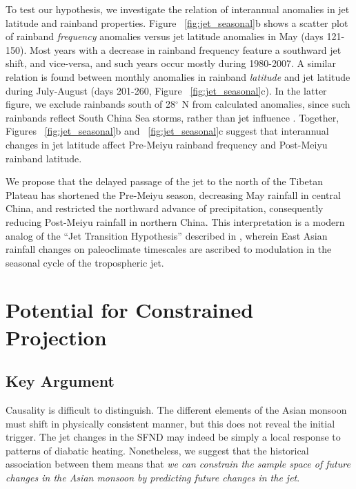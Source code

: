 	To test our hypothesis, we investigate the relation of interannual anomalies in jet latitude and rainband properties. Figure ~\ref{fig:jet_seasonal}b shows a scatter plot of rainband \textit{frequency} anomalies versus jet latitude anomalies in May (days 121-150). Most years with a decrease in rainband frequency feature a southward jet shift, and vice-versa, and such years occur mostly during 1980-2007. A similar relation is found between monthly anomalies in rainband \textit{latitude} and jet latitude during July-August (days 201-260, Figure ~\ref{fig:jet_seasonal}c). In the latter figure, we exclude rainbands south of 28$^{\circ}$ N from calculated anomalies, since such rainbands reflect South China Sea storms, rather than jet influence \citep{Day2015}. Together, Figures ~\ref{fig:jet_seasonal}b and ~\ref{fig:jet_seasonal}c suggest that interannual changes in jet latitude affect Pre-Meiyu rainband frequency and Post-Meiyu rainband latitude.
	
	 	 
	We propose that the delayed passage of the jet to the north of the Tibetan Plateau has shortened the Pre-Meiyu season, decreasing May rainfall in central China, and restricted the northward advance of precipitation, consequently reducing Post-Meiyu rainfall in northern China. This interpretation is a modern analog of the ``Jet Transition Hypothesis'' described in \citet{Chiang2015}, wherein East Asian rainfall changes on paleoclimate timescales are ascribed to modulation in the seasonal cycle of the tropospheric jet. 	
 		 
\section{Potential for Constrained Projection}

\subsection{Key Argument}
	Causality is difficult to distinguish. The different elements of the Asian monsoon must shift in physically consistent manner, but this does not reveal the initial trigger. The jet changes in the SFND may indeed be simply a local response to patterns of diabatic heating. Nonetheless, we suggest that the historical association between them means that \textit{we can constrain the sample space of future changes in the Asian monsoon by predicting future changes in the jet}.
	
